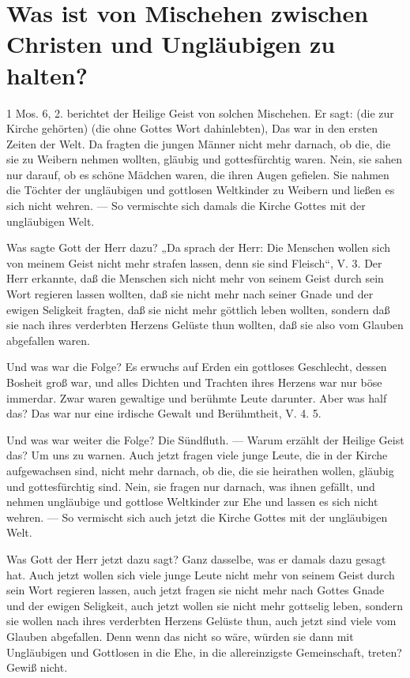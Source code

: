 \chapter[Mischehen zwischen Christen und Ungläubigen]{Was ist von Mischehen zwischen Christen und Ungläubigen zu halten?}

1 Mos. 6, 2. berichtet der Heilige Geist von solchen Mischehen. Er sagt:  (die zur Kirche gehörten)  (die ohne Gottes Wort dahinlebten),  Das war in den ersten Zeiten der Welt. Da fragten die jungen Männer nicht mehr darnach, ob die, die sie zu Weibern nehmen wollten, gläubig und gottesfürchtig waren. Nein, sie sahen nur darauf, ob es schöne Mädchen waren, die ihren Augen gefielen. Sie nahmen die Töchter der ungläubigen und gottlosen Weltkinder zu Weibern und ließen es sich nicht wehren. — So vermischte sich damals die Kirche Gottes mit der ungläubigen Welt.

Was sagte Gott der Herr dazu? „Da sprach der Herr: Die Menschen wollen sich von meinem Geist nicht mehr strafen lassen, denn sie sind Fleisch“, V. 3. Der Herr erkannte, daß die Menschen sich nicht mehr von seinem Geist durch sein Wort regieren lassen wollten, daß sie nicht mehr nach seiner Gnade und der ewigen Seligkeit fragten, daß sie nicht mehr göttlich leben wollten, sondern daß sie nach ihres verderbten Herzens Gelüste thun wollten, daß sie also vom Glauben abgefallen waren.

Und was war die Folge? Es erwuchs auf Erden ein gottloses Geschlecht, dessen Bosheit groß war, und alles Dichten und Trachten ihres Herzens war nur böse immerdar. Zwar waren gewaltige und berühmte Leute darunter. Aber was half das? Das war nur eine irdische Gewalt und Berühmtheit, V. 4. 5.

Und was war weiter die Folge? Die Sündfluth. — Warum erzählt der Heilige Geist das? Um uns zu warnen. Auch jetzt fragen viele junge Leute, die in der Kirche aufgewachsen sind, nicht mehr darnach, ob die, die sie heirathen wollen, gläubig und gottesfürchtig sind. Nein, sie fragen nur darnach, was ihnen gefällt, und nehmen ungläubige und gottlose Weltkinder zur Ehe und lassen es sich nicht wehren. — So vermischt sich auch jetzt die Kirche Gottes mit der ungläubigen Welt.

Was Gott der Herr jetzt dazu sagt? Ganz dasselbe, was er damals dazu gesagt hat. Auch jetzt wollen sich viele junge Leute nicht mehr von seinem Geist durch sein Wort regieren lassen, auch jetzt fragen sie nicht mehr nach Gottes Gnade und der ewigen Seligkeit, auch jetzt wollen sie nicht mehr gottselig leben, sondern sie wollen nach ihres verderbten Herzens Gelüste thun, auch jetzt sind viele vom Glauben abgefallen. Denn wenn das nicht so wäre, würden sie dann mit Ungläubigen und Gottlosen in die Ehe, in die allereinzigste Gemeinschaft, treten? Gewiß nicht.


